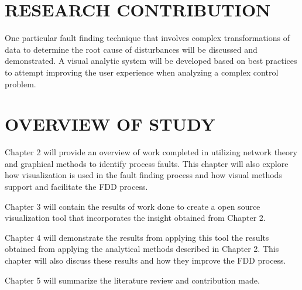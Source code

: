 \section{RESEARCH CONTRIBUTION}

One particular fault finding technique that involves complex transformations of data to determine the root cause of disturbances will be discussed and demonstrated. A visual analytic system will be developed based on best practices to attempt improving the user experience when analyzing a complex control problem.

\section{OVERVIEW OF STUDY}

Chapter 2 will provide an overview of work completed in utilizing network theory and graphical methods to identify process faults. This chapter will also explore how visualization is used in the fault finding process and how visual methods support and facilitate the FDD process.

Chapter 3 will contain the results of work done to create a open source visualization tool that incorporates the insight obtained from Chapter 2.

Chapter 4 will demonstrate the results from applying this tool the results obtained from applying the analytical methods described in Chapter 2. This chapter will also discuss these results and how they improve the FDD process.

Chapter 5 will summarize the literature review and contribution made.



